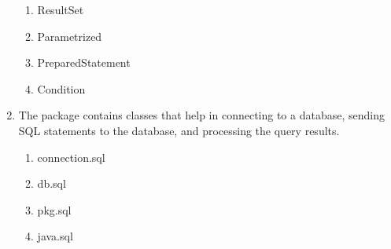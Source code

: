 \documentclass[11pt,a4paper]{article}
\begin{document}
\begin{enumerate}
\begin{enumerate}
\item ResultSet 
\item Parametrized
\item PreparedStatement
\item Condition
\end{enumerate}
\item  The \underline{\hspace{2cm}} package contains classes that help in connecting to a database, sending SQL statements to the database, and processing the query results.
\begin{enumerate}
\item connection.sql
\item db.sql
\item pkg.sql
\item java.sql
\end{enumerate}
\end{enumerate}
\end{document}

